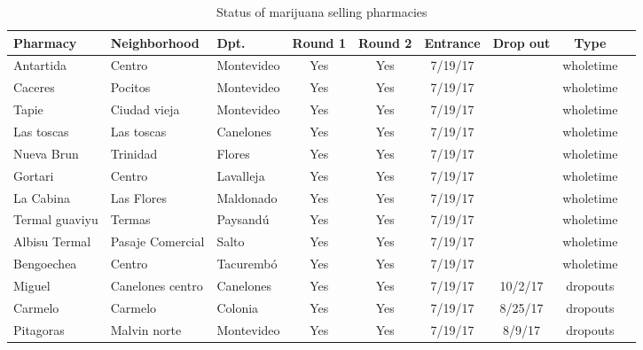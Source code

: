 \documentclass[11pt]{article}
\begin{document}
\begin{small}
\begin{table}[htbp!]
\scriptsize
  \centering
   \caption{Status of  marijuana selling pharmacies}
  \label{tab:pharmsalestatus}
  \begin{tabular}{@{}lllcccccc@{}}
\textbf{Pharmacy}  &  \textbf{Neighborhood}  &  \textbf{Dpt.}  &  \textbf{Round 1}  &  \textbf{Round 2}  &  \textbf{Entrance}  &  \textbf{Drop out}  &  \textbf{Type}  \\
\midrule
Antartida     &     Centro     &     Montevideo     &     Yes     &     Yes     &     7/19/17     &        &     wholetime  \\
 Caceres      &     Pocitos     &     Montevideo     &     Yes     &     Yes     &     7/19/17     &        &     wholetime  \\
 Tapie     &     Ciudad vieja     &     Montevideo     &     Yes     &     Yes     &     7/19/17     &      &     wholetime  \\
 Las toscas     &     Las toscas     &     Canelones     &     Yes     &     Yes     &     7/19/17     &      &     wholetime  \\
 Nueva Brun     &     Trinidad     &     Flores     &     Yes     &     Yes     &     7/19/17     &        &     wholetime  \\
 Gortari     &     Centro     &     Lavalleja     &     Yes     &     Yes     &     7/19/17     &        &     wholetime  \\
 La Cabina     &     Las Flores     &     Maldonado     &     Yes     &     Yes     &     7/19/17     &      &     wholetime  \\
 Termal guaviyu     &     Termas     &     Paysandú     &     Yes     &     Yes     &     7/19/17     &      &     wholetime  \\
 Albisu Termal     &     Pasaje Comercial    &   Salto  &     Yes     &     Yes     &     7/19/17     &     &     wholetime  \\
 Bengoechea     &     Centro     &     Tacurembó     &     Yes     &     Yes     &     7/19/17     &        &     wholetime  \\
 Miguel     &     Canelones centro   &    Canelones   &   Yes     &   Yes     &   7/19/17     &  10/2/17     &     dropouts  \\
 Carmelo     &     Carmelo     &     Colonia     &     Yes     &     Yes     &     7/19/17     &   8/25/17     &     dropouts  \\
 Pitagoras     &     Malvin norte     &     Montevideo     &     Yes     &     Yes     &    7/19/17     &     8/9/17     &     dropouts  \\

\end{tabular}
\end{table}
\end{small}
\end{document}
